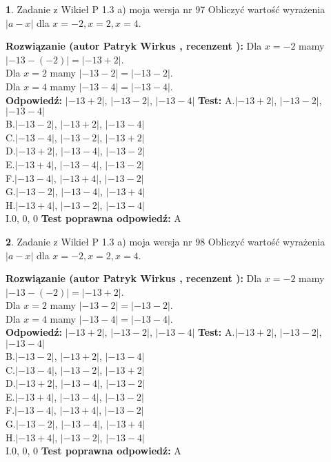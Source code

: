 \documentclass[12pt, a4paper]{article}
\theoremstyle{definition} %
\newtheorem{zad}{}
\newcommand{\zadStart}[1]{\begin{zad}#1\newline}
\newcommand{\zadStop}{\end{zad}}
\newcommand{\rozwStart}[2]{\noindent \textbf{Rozwiązanie (autor #1 , recenzent #2): }\newline}
\newcommand{\rozwStop}{\newline}
\newcommand{\odpStart}{\noindent \textbf{Odpowiedź:}\newline}
\newcommand{\odpStop}{\newline}
\newcommand{\testStart}{\noindent \textbf{Test:}\newline}
\newcommand{\testStop}{\newline}
\newcommand{\kluczStart}{\noindent \textbf{Test poprawna odpowiedź:}\newline}
\newcommand{\kluczStop}{\newline}
\begin{document}
\zadStart{Zadanie z Wikieł P 1.3 a) moja wersja nr 97}
Obliczyć wartość wyrażenia $|a - x|$ dla $x=-2,x=2,x=4$.
\zadStop
\rozwStart{Patryk Wirkus}{}
Dla $x = -2$ mamy $|-13 - (-2)| = |-13 + 2|$.\\
Dla $x = 2$ mamy $|-13 - 2| = |-13 - 2|$.\\
Dla $x = 4$ mamy $|-13 - 4| = |-13 - 4|$.\\
\rozwStop
\odpStart
$|-13 + 2|$, $|-13 - 2|$, $|-13 - 4|$
\odpStop
\testStart
A.$|-13 + 2|$, $|-13 - 2|$, $|-13 - 4|$\\
B.$|-13 - 2|$, $|-13 + 2|$, $|-13 - 4|$\\
C.$|-13 - 4|$, $|-13 - 2|$, $|-13 + 2|$\\
D.$|-13 + 2|$, $|-13 - 4|$, $|-13 - 2|$\\
E.$|-13 + 4|$, $|-13 - 4|$, $|-13 - 2|$\\
F.$|-13 - 4|$, $|-13 + 4|$, $|-13 - 2|$\\
G.$|-13 - 2|$, $|-13 - 4|$, $|-13 + 4|$\\
H.$|-13 + 4|$, $|-13 - 2|$, $|-13 - 4|$\\
I.$0$, $0$, $0$
\testStop
\kluczStart
A
\kluczStop



\zadStart{Zadanie z Wikieł P 1.3 a) moja wersja nr 98}
Obliczyć wartość wyrażenia $|a - x|$ dla $x=-2,x=2,x=4$.
\zadStop
\rozwStart{Patryk Wirkus}{}
Dla $x = -2$ mamy $|-13 - (-2)| = |-13 + 2|$.\\
Dla $x = 2$ mamy $|-13 - 2| = |-13 - 2|$.\\
Dla $x = 4$ mamy $|-13 - 4| = |-13 - 4|$.\\
\rozwStop
\odpStart
$|-13 + 2|$, $|-13 - 2|$, $|-13 - 4|$
\odpStop
\testStart
A.$|-13 + 2|$, $|-13 - 2|$, $|-13 - 4|$\\
B.$|-13 - 2|$, $|-13 + 2|$, $|-13 - 4|$\\
C.$|-13 - 4|$, $|-13 - 2|$, $|-13 + 2|$\\
D.$|-13 + 2|$, $|-13 - 4|$, $|-13 - 2|$\\
E.$|-13 + 4|$, $|-13 - 4|$, $|-13 - 2|$\\
F.$|-13 - 4|$, $|-13 + 4|$, $|-13 - 2|$\\
G.$|-13 - 2|$, $|-13 - 4|$, $|-13 + 4|$\\
H.$|-13 + 4|$, $|-13 - 2|$, $|-13 - 4|$\\
I.$0$, $0$, $0$
\testStop
\kluczStart
A
\kluczStop
\end{document}
